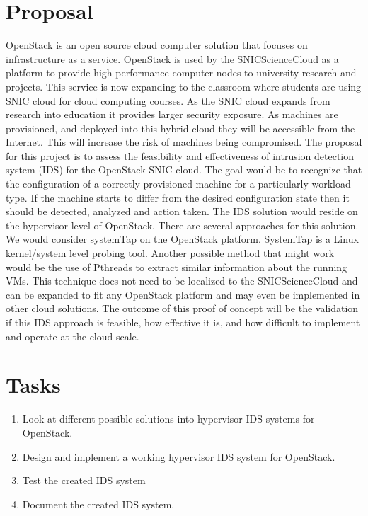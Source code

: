\documentclass[12pt]{article}
\begin{document}
\section{Proposal}

OpenStack is an open source cloud computer solution that focuses on infrastructure as a service. OpenStack is used by the SNICScienceCloud as a platform to provide high performance computer nodes to university research and projects. This service is now expanding to the classroom where students are using SNIC cloud for cloud computing courses. As the SNIC cloud expands from research into education it provides larger security exposure. As machines are provisioned, and deployed into this hybrid cloud they will be accessible from the Internet. This will increase the risk of machines being compromised. The proposal for this project is to assess the feasibility and effectiveness of  intrusion detection system (IDS) for the OpenStack SNIC cloud. The goal would be to recognize that the configuration of a correctly provisioned machine for a particularly workload type. If the machine starts to differ from the desired configuration state then it should be detected, analyzed and action taken. The IDS solution would reside on the hypervisor level of OpenStack. There are several approaches for this solution.  We would consider systemTap on the OpenStack platform. SystemTap is a Linux kernel/system level probing tool. Another possible method that might work would be the use of Pthreads to extract similar information about the running VMs. This technique does not need to be localized to the SNICScienceCloud and can be expanded to ﬁt any OpenStack platform and may even be implemented in other cloud solutions.
The outcome of this proof of concept will be the validation if this IDS approach is feasible, how effective it is, and how difficult to implement and operate at the cloud scale.

\section{Tasks}

\begin{enumerate}
    \item Look at different possible solutions into hypervisor IDS systems for OpenStack.
    \item Design and implement a working hypervisor IDS system for OpenStack.
    \item Test the created IDS system
    \item Document the created IDS system.
\end{enumerate}
\end{document}
